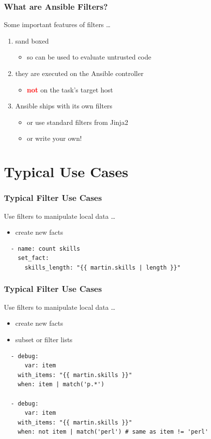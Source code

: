 \documentclass[pdf]{beamer}
\begin{document}
\begin{frame}
  \frametitle{What are Ansible Filters?}
  Some important features of filters \ldots
  \pause{}
  \begin{enumerate}
    \item<+->{sand boxed}
      \begin{itemize}
        \item<+->{so can be used to evaluate untrusted code}
      \end{itemize}
    \item<+->{they are executed on the Ansible controller}
      \begin{itemize}
        \item<+->{\textcolor{red}{\textbf{not}} on the task's target host}
      \end{itemize}
    \item<+->{Ansible ships with its own filters}
      \begin{itemize}
        \item<+->{or use standard filters from Jinja2}
        \item<+->{or write your own!}
      \end{itemize}
  \end{enumerate}
\end{frame}

\section{Typical Use Cases}

\begin{frame}[fragile]
  \frametitle{Typical Filter Use Cases}
  Use filters to manipulate local data \ldots
  \begin{itemize}[<+->]
    \item \alert {create new facts}
  \end{itemize}
  \begin{lstlisting}
  - name: count skills
    set_fact:
      skills_length: "{{ martin.skills | length }}"
  \end{lstlisting}
\end{frame}

\begin{frame}[fragile]
  \frametitle{Typical Filter Use Cases}
  Use filters to manipulate local data \ldots
  \begin{itemize}
    \item {create new facts}
    \item \alert {subset or filter lists}
  \end{itemize}
  \begin{lstlisting}
  - debug:
      var: item
    with_items: "{{ martin.skills }}"
    when: item | match('p.*')

  - debug:
      var: item
    with_items: "{{ martin.skills }}"
    when: not item | match('perl') # same as item != 'perl'
  \end{lstlisting}
\end{frame}
\end{document}
